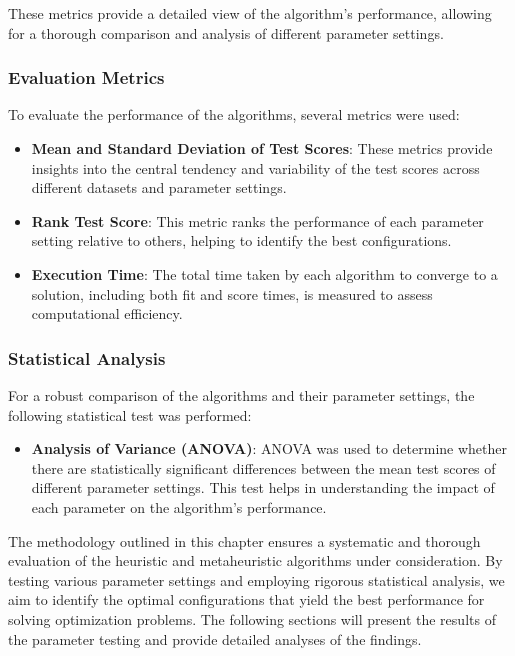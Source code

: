\documentclass[
]{article}
\begin{document}
    These metrics provide a detailed view of the algorithm's performance, allowing for a thorough comparison and analysis of different parameter settings.

    \subsubsection{Evaluation Metrics}

    To evaluate the performance of the algorithms, several metrics were used:

    \begin{itemize}
        \item \textbf{Mean and Standard Deviation of Test Scores}: These metrics provide insights into the central tendency and variability of the test scores across different datasets and parameter settings.
        \item \textbf{Rank Test Score}: This metric ranks the performance of each parameter setting relative to others, helping to identify the best configurations.
        \item \textbf{Execution Time}: The total time taken by each algorithm to converge to a solution, including both fit and score times, is measured to assess computational efficiency.
    \end{itemize}

    \subsubsection{Statistical Analysis}

    For a robust comparison of the algorithms and their parameter settings, the following statistical test was performed:

    \begin{itemize}
        \item \textbf{Analysis of Variance (ANOVA)}: ANOVA was used to determine whether there are statistically significant differences between the mean test scores of different parameter settings. This test helps in understanding the impact of each parameter on the algorithm's performance.
    \end{itemize}


    The methodology outlined in this chapter ensures a systematic and thorough evaluation of the heuristic and metaheuristic algorithms under consideration. By testing various parameter settings and employing rigorous statistical analysis, we aim to identify the optimal configurations that yield the best performance for solving optimization problems. The following sections will present the results of the parameter testing and provide detailed analyses of the findings.
\end{document}

